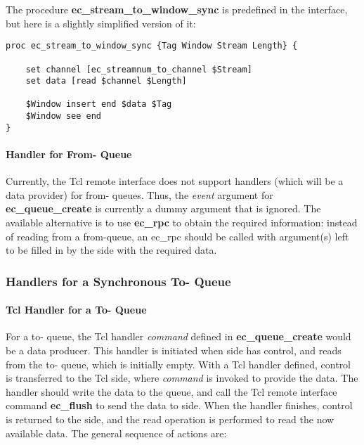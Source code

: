 The procedure {\bf ec_stream_to_window_sync} is predefined in the
interface, but here is a slightly
simplified version of it:

\begin{verbatim}
proc ec_stream_to_window_sync {Tag Window Stream Length} {

    set channel [ec_streamnum_to_channel $Stream]
    set data [read $channel $Length]

    $Window insert end $data $Tag
    $Window see end
}
\end{verbatim}

\paragraph{{\eclipse} Handler for From-{\eclipse} Queue}

Currently, the Tcl remote interface does not support {\eclipse} handlers
(which will be a data provider) for from-{\eclipse} queues. Thus, the {\it
event\/} argument for {\bf ec_queue_create} is currently a dummy argument
that is ignored. The available alternative is to use {\bf ec_rpc} to obtain
the required information: instead of reading from a from-\eclipse queue, an
ec_rpc should be called with argument(s) left to be filled in by the
{\eclipse} side with the required data. 

\subsubsection{Handlers for a Synchronous To-{\eclipse} Queue}

\paragraph{Tcl Handler for a To-{\eclipse} Queue}

\label{toeclipse-tclhandler}

For a to-{\eclipse} queue, the Tcl handler {\it command\/} defined in {\bf
ec_queue_create} would be a data
producer. This handler is initiated when {\eclipse} side has control, and
reads from the to-{\eclipse} queue, which is initially empty. With a Tcl
handler defined, control is transferred to the Tcl side, where {\it
command\/} is invoked to provide the data. The handler should write the
data to the queue, and call the Tcl remote interface command {\bf ec_flush}
to send the data to {\eclipse} side. When the handler finishes,
control is returned to the {\eclipse} side, and the read operation is
performed to read the now available data. The general sequence of actions are:

